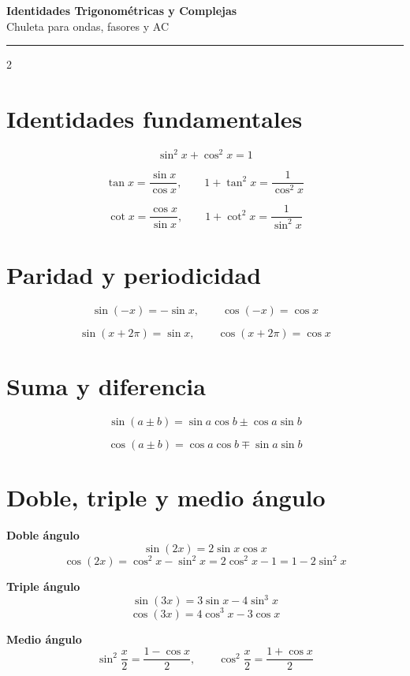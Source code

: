 \documentclass[10pt,a4paper]{article}
\begin{document}
\begin{center}
{\Large \textbf{Identidades Trigonométricas y Complejas}}\\
{\small Chuleta para ondas, fasores y AC}
\end{center}

\hrule
\vspace{0.3cm}

\begin{multicols}{2}

\section*{Identidades fundamentales}

\[
\sin^2 x + \cos^2 x = 1
\]

\[
\tan x = \frac{\sin x}{\cos x}, \qquad
1+\tan^2 x = \frac{1}{\cos^2 x}
\]

\[
\cot x = \frac{\cos x}{\sin x}, \qquad
1+\cot^2 x = \frac{1}{\sin^2 x}
\]

\section*{Paridad y periodicidad}

\[
\sin(-x) = -\sin x, \qquad
\cos(-x) = \cos x
\]

\[
\sin(x+2\pi)=\sin x, \qquad
\cos(x+2\pi)=\cos x
\]

\section*{Suma y diferencia}

\[
\sin(a\pm b)=\sin a\cos b \pm \cos a\sin b
\]

\[
\cos(a\pm b)=\cos a\cos b \mp \sin a\sin b
\]

\section*{Doble, triple y medio ángulo}

\textbf{Doble ángulo}
\[
\sin(2x)=2\sin x\cos x
\]
\[
\cos(2x)=\cos^2 x-\sin^2 x
=2\cos^2 x-1=1-2\sin^2 x
\]

\textbf{Triple ángulo}
\[
\sin(3x)=3\sin x-4\sin^3 x
\]
\[
\cos(3x)=4\cos^3 x-3\cos x
\]

\textbf{Medio ángulo}
\[
\sin^2\frac{x}{2}=\frac{1-\cos x}{2}, \qquad
\cos^2\frac{x}{2}=\frac{1+\cos x}{2}
\]


\end{multicols}
\end{document}
